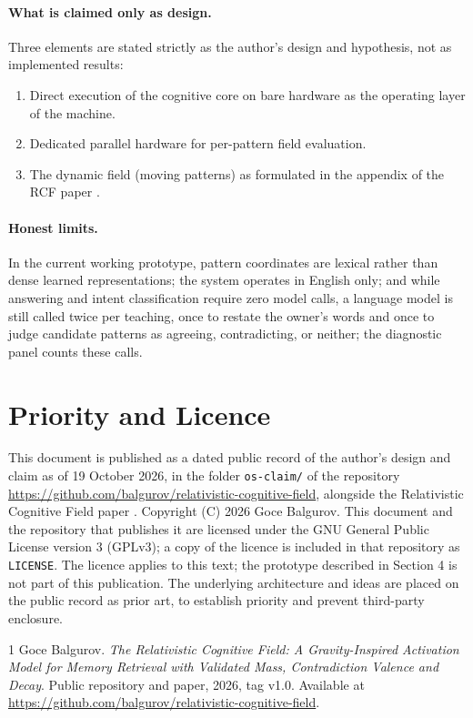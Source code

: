 \documentclass[11pt]{article}
\theoremstyle{remark}
\begin{document}
\paragraph{What is claimed only as design.}
Three elements are stated strictly as the author's design and hypothesis, not as implemented results:
\begin{enumerate}
\item Direct execution of the cognitive core on bare hardware as the operating layer of the machine.
\item Dedicated parallel hardware for per-pattern field evaluation.
\item The dynamic field (moving patterns) as formulated in the appendix of the RCF paper \cite{balgurov2026rcf}.
\end{enumerate}

\paragraph{Honest limits.}
In the current working prototype, pattern coordinates are lexical rather than dense learned representations; the system operates in English only; and while answering and intent classification require zero model calls, a language model is still called twice per teaching, once to restate the owner's words and once to judge candidate patterns as agreeing, contradicting, or neither; the diagnostic panel counts these calls.

\section{Priority and Licence}

This document is published as a dated public record of the author's design and claim as of 19 October 2026, in the folder \texttt{os-claim/} of the repository \url{https://github.com/balgurov/relativistic-cognitive-field}, alongside the Relativistic Cognitive Field paper \cite{balgurov2026rcf}. Copyright (C) 2026 Goce Balgurov. This document and the repository that publishes it are licensed under the GNU General Public License version 3 (GPLv3); a copy of the licence is included in that repository as \texttt{LICENSE}. The licence applies to this text; the prototype described in Section 4 is not part of this publication. The underlying architecture and ideas are placed on the public record as prior art, to establish priority and prevent third-party enclosure.

\begin{thebibliography}{1}
Goce Balgurov.
\newblock \emph{The Relativistic Cognitive Field: A Gravity-Inspired Activation Model for Memory Retrieval with Validated Mass, Contradiction Valence and Decay}.
\newblock Public repository and paper, 2026, tag v1.0. Available at \url{https://github.com/balgurov/relativistic-cognitive-field}.
\end{thebibliography}
\end{document}
